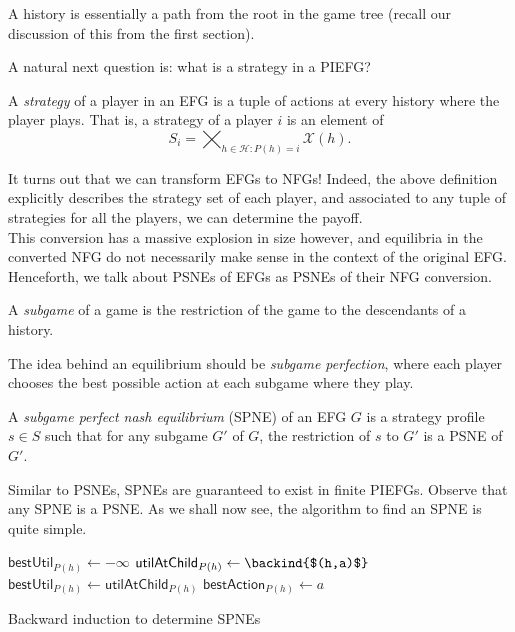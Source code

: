 	A history is essentially a path from the root in the game tree (recall our discussion of this from the first section).

	A natural next question is: what is a strategy in a PIEFG?

	\begin{fdef}[Strategy]
		A \emph{strategy} of a player in an EFG is a tuple of actions at every history where the player plays. That is, a strategy of a player $i$ is an element of
		\[ S_i = \bigtimes_{h \in \mathcal{H} : P(h) = i} \mathcal{X}(h). \]
	\end{fdef}

	It turns out that we can transform EFGs to NFGs! Indeed, the above definition explicitly describes the strategy set of each player, and associated to any tuple of strategies for all the players, we can determine the payoff.\\
	This conversion has a massive explosion in size however, and equilibria in the converted NFG do not necessarily make sense in the context of the original EFG. %
	Henceforth, we talk about PSNEs of EFGs as PSNEs of their NFG conversion.

	\begin{fdef}
		A \emph{subgame} of a game is the restriction of the game to the descendants of a history.
	\end{fdef}

	The idea behind an equilibrium should be \emph{subgame perfection}, where each player chooses the best possible action at each subgame where they play.

	\begin{fdef}
		A \emph{subgame perfect nash equilibrium} (SPNE) of an EFG $G$ is a strategy profile $s \in S$ such that for any subgame $G'$ of $G$, the restriction of $s$ to $G'$ is a PSNE of $G'$.
	\end{fdef}

	Similar to PSNEs, SPNEs are guaranteed to exist in finite PIEFGs.
	Observe that any SPNE is a PSNE. As we shall now see, the algorithm to find an SPNE is quite simple.\\

	\begin{algorithm}[H]
		\DontPrintSemicolon
		\SetNoFillComment
		 { 
			 {
				\;
			}
			$\mathsf{bestUtil}_{P(h)} \gets -\infty$\;
			 {
				$\mathsf{utilAtChild}_{P(h)} \gets \backind{$(h,a)$}$\;
				 {
					$\mathsf{bestUtil}_{P(h)} \gets \mathsf{utilAtChild}_{P(h)}$\;
					$\mathsf{bestAction}_{P(h)} \gets a$\;
				}
			}
		}
		\caption{Backward induction to determine SPNEs}
	\end{algorithm}

